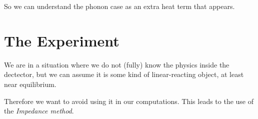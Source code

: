 \documentclass[a4paper, 11pt]{article}
\begin{document}
So we can understand the phonon case as an extra heat term that appears.




\section{The Experiment} %
\label{sec:the_experiment}

We are in a situation where we do not (fully) know the physics inside the dectector, but we can assume it is some kind of linear-reacting object, at least near equilibrium.

Therefore we want to avoid using it in our computations. This leads to the use of the \textit{Impedance method}. 
\end{document}
